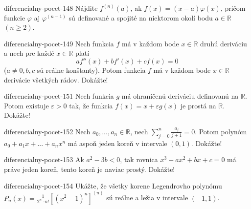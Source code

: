 \begin{defproblem}{diferencialny-pocet-148}
Nájdite $f^{(n)}(a)$, ak $f(x)=(x-a)\varphi (x)$, pričom funkcie $\varphi$ aj $\varphi^{(n-1)}$ sú definované a spojité na niektorom okolí bodu $a\in\mathbb{R}$ $(n\geq 2)$.
\end{defproblem}

\begin{defproblem}{diferencialny-pocet-149}
Nech funkcia $f$ má v každom bode $x\in\mathbb{R}$ druhú deriváciu a nech pre každé $x\in\mathbb{R}$ platí
$$af''(x)+bf'(x)+cf(x)=0$$
($a\neq 0,b,c$ sú reálne konštanty). Potom funkcia $f$ má v každom bode $x\in\mathbb{R}$ derivácie všetkých rádov. Dokážte!
\end{defproblem}


\begin{defproblem}{diferencialny-pocet-151}
Nech funkcia $g$ má ohraničenú deriváciu definovanú na $\mathbb{R}$. Potom existuje $\varepsilon >0$ tak, že funkcia $f(x)=x+\varepsilon g(x)$ je prostá na $\mathbb{R}$. Dokážte!
\end{defproblem}

\begin{defproblem}{diferencialny-pocet-152}
Nech $a_0,...,a_n\in\mathbb{R}$, nech $\sum_{j=0}^n\frac{a_j}{j+1}=0$. Potom polynóm $a_0+a_1x+...+a_nx^n$ má aspoň jeden koreň v intervale $(0,1)$. Dokážte!
\end{defproblem}

\begin{defproblem}{diferencialny-pocet-153}
Ak $a^2-3b<0$, tak rovnica $x^3+ax^2+bx+c=0$ má práve jeden koreň, tento koreň je naviac prostý. Dokážte!
\end{defproblem}

\begin{defproblem}{diferencialny-pocet-154}
Ukážte, že všetky korene Legendrovho polynómu $P_n(x)=\frac{1}{2^n\cdot n!}[(x^2-1)^n]^{(n)}$ sú reálne a ležia v intervale $(-1,1)$.
\end{defproblem}


